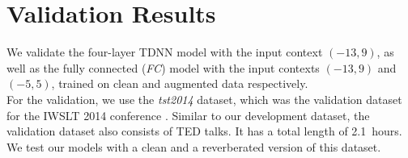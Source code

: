 \section{Validation Results}
We validate the four-layer TDNN model with the input context $(-13, 9)$, as well as the fully connected (\textit{FC}) model with the input contexts $(-13, 9)$ and $(-5, 5)$, trained on clean and augmented data respectively. \\
For the validation, we use the \textit{tst2014} dataset, which was the validation dataset for the IWSLT 2014 conference \cite{cettolo2014report}. Similar to our development dataset, the validation dataset also consists of TED talks. It has a total length of 2.1~hours. We test our models with a clean and a reverberated version of this dataset. \\ \\
